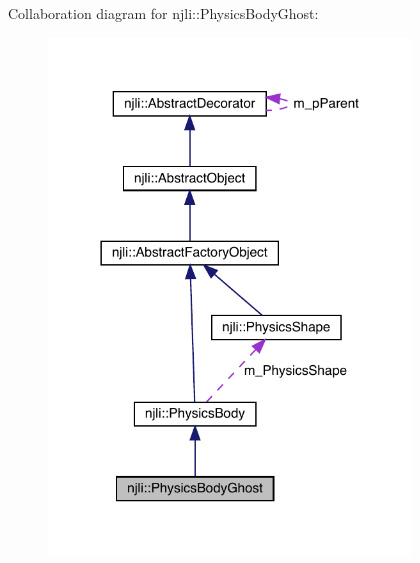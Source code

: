 Collaboration diagram for njli\+:\+:Physics\+Body\+Ghost\+:\nopagebreak
\begin{figure}[H]
\begin{center}
\leavevmode
\includegraphics[width=273pt]{classnjli_1_1_physics_body_ghost__coll__graph}
\end{center}
\end{figure}

